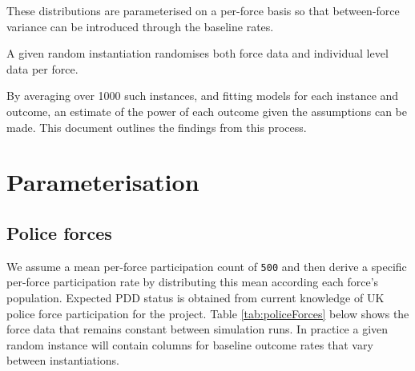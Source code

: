 \documentclass[
]{article}
\begin{document}
These distributions are parameterised on a per-force basis so that between-force variance can be introduced through the baseline rates.

A given random instantiation randomises both force data and individual level data per force.

By averaging over 1000 such instances, and fitting models for each instance and outcome, an estimate of the power of each outcome given the assumptions can be made. This document outlines the findings from this process.

\hypertarget{parameterisation}{%
\section{Parameterisation}\label{parameterisation}}

\hypertarget{police-forces}{%
\subsection{Police forces}\label{police-forces}}

We assume a mean per-force participation count of \texttt{500} and then derive a specific per-force participation rate by distributing this mean according each force's population. Expected PDD status is obtained from current knowledge of UK police force participation for the project. Table \ref{tab:policeForces} below shows the force data that remains constant between simulation runs. In practice a given random instance will contain columns for baseline outcome rates that vary between instantiations.
\end{document}
